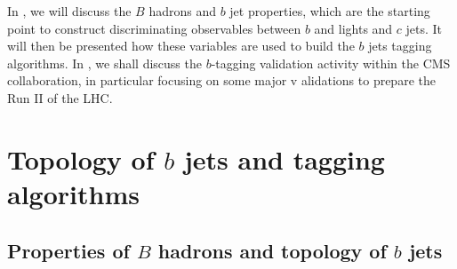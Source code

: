     In , we will discuss the $B$ hadrons and $b$ jet properties,
    which are the starting point to construct discriminating observables between $b$ and lights
    and $c$ jets. It will then be presented how these variables are used to build the $b$ jets
    tagging algorithms.
    In , we shall discuss the $b$-tagging
    validation activity within the CMS collaboration, in particular focusing on some major v
    alidations to prepare the Run II of the LHC.

    \section{Topology of $b$ jets and tagging algorithms \label{sec:bTagAlgorithms}}

    \subsection{Properties of $B$ hadrons and topology of $b$ jets}

